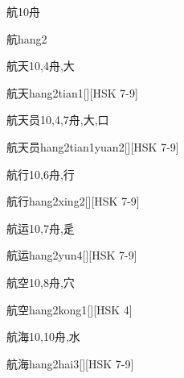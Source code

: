 \begin{Entry}{航}{10}{⾈}
  \begin{Phonetics}{航}{hang2}
  \end{Phonetics}
\end{Entry}

\begin{Entry}{航天}{10,4}{⾈,⼤}
  \begin{Phonetics}{航天}{hang2tian1}[][HSK 7-9]
  \end{Phonetics}
\end{Entry}

\begin{Entry}{航天员}{10,4,7}{⾈,⼤,⼝}
  \begin{Phonetics}{航天员}{hang2tian1yuan2}[][HSK 7-9]
  \end{Phonetics}
\end{Entry}

\begin{Entry}{航行}{10,6}{⾈,⾏}
  \begin{Phonetics}{航行}{hang2xing2}[][HSK 7-9]
  \end{Phonetics}
\end{Entry}

\begin{Entry}{航运}{10,7}{⾈,⾡}
  \begin{Phonetics}{航运}{hang2yun4}[][HSK 7-9]
  \end{Phonetics}
\end{Entry}

\begin{Entry}{航空}{10,8}{⾈,⽳}
  \begin{Phonetics}{航空}{hang2kong1}[][HSK 4]
  \end{Phonetics}
\end{Entry}

\begin{Entry}{航海}{10,10}{⾈,⽔}
  \begin{Phonetics}{航海}{hang2hai3}[][HSK 7-9]
  \end{Phonetics}
\end{Entry}

